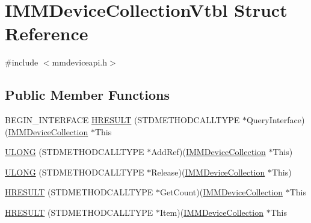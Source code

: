 \hypertarget{struct_i_m_m_device_collection_vtbl}{}\section{I\+M\+M\+Device\+Collection\+Vtbl Struct Reference}
\label{struct_i_m_m_device_collection_vtbl}


{\ttfamily \#include $<$mmdeviceapi.\+h$>$}

\subsection*{Public Member Functions}
\begin{DoxyCompactItemize}
\item 
B\+E\+G\+I\+N\+\_\+\+I\+N\+T\+E\+R\+F\+A\+CE \hyperlink{struct_i_m_m_device_collection_vtbl_a9c62a498b6eb8d32ab5b1735cb992121}{H\+R\+E\+S\+U\+LT} (S\+T\+D\+M\+E\+T\+H\+O\+D\+C\+A\+L\+L\+T\+Y\+PE $\ast$Query\+Interface)(\hyperlink{mmdeviceapi_8h_a176c91c7707fe6b1747f16e43440be16}{I\+M\+M\+Device\+Collection} $\ast$This
\item 
\hyperlink{struct_i_m_m_device_collection_vtbl_af806e5c194c2c41c4d43354eaf914eab}{U\+L\+O\+NG} (S\+T\+D\+M\+E\+T\+H\+O\+D\+C\+A\+L\+L\+T\+Y\+PE $\ast$Add\+Ref)(\hyperlink{mmdeviceapi_8h_a176c91c7707fe6b1747f16e43440be16}{I\+M\+M\+Device\+Collection} $\ast$This)
\item 
\hyperlink{struct_i_m_m_device_collection_vtbl_ae24e4d091500d21e5705f6395008d610}{U\+L\+O\+NG} (S\+T\+D\+M\+E\+T\+H\+O\+D\+C\+A\+L\+L\+T\+Y\+PE $\ast$Release)(\hyperlink{mmdeviceapi_8h_a176c91c7707fe6b1747f16e43440be16}{I\+M\+M\+Device\+Collection} $\ast$This)
\item 
\hyperlink{struct_i_m_m_device_collection_vtbl_aad5ddb381f71cb24052814d08185d3a8}{H\+R\+E\+S\+U\+LT} (S\+T\+D\+M\+E\+T\+H\+O\+D\+C\+A\+L\+L\+T\+Y\+PE $\ast$Get\+Count)(\hyperlink{mmdeviceapi_8h_a176c91c7707fe6b1747f16e43440be16}{I\+M\+M\+Device\+Collection} $\ast$This
\item 
\hyperlink{struct_i_m_m_device_collection_vtbl_af10453eab247bb98adb357c44fe42b55}{H\+R\+E\+S\+U\+LT} (S\+T\+D\+M\+E\+T\+H\+O\+D\+C\+A\+L\+L\+T\+Y\+PE $\ast$Item)(\hyperlink{mmdeviceapi_8h_a176c91c7707fe6b1747f16e43440be16}{I\+M\+M\+Device\+Collection} $\ast$This
\end{DoxyCompactItemize}
